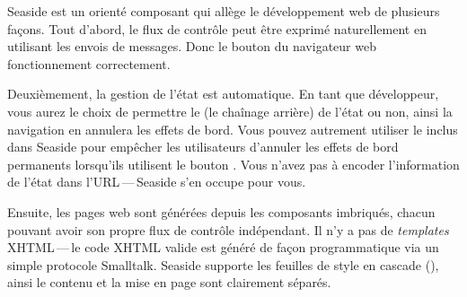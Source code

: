 \documentclass[a4paper,10pt,twoside]{book}
\begin{document}

Seaside est un \framework orienté composant
qui allège le développement web de plusieurs façons.
Tout d'abord, le flux de contrôle
peut être exprimé naturellement en utilisant les envois de messages.
Donc le bouton \backbtn du navigateur web fonctionnement correctement.

Deuxièmement, la gestion de l'état est automatique. %
En tant que développeur, vous aurez le choix de permettre le
\backtracking (\ie le chaînage arrière) de l'état ou non, ainsi la
navigation en \backbtn{} annulera les effets de bord.
Vous pouvez autrement utiliser le 
inclus dans Seaside pour empêcher les utilisateurs d'annuler les
effets de bord permanents lorsqu'ils utilisent le bouton \backbtn.
Vous n'avez pas à encoder l'information de l'état dans
l'URL\,---\,Seaside s'en occupe pour vous. 

Ensuite, les pages web sont générées depuis les composants imbriqués,
chacun pouvant avoir son propre flux de contrôle indépendant.
Il n'y a pas de \emph{templates} XHTML\,---\,le code XHTML valide est
généré de façon programmatique via un simple protocole Smalltalk.
Seaside supporte les feuilles de style en cascade 
 (), ainsi le contenu et la mise en page sont clairement
 séparés.
\end{document}

